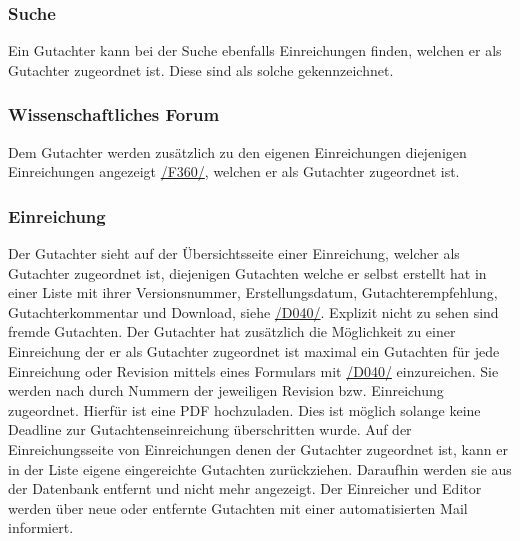\subsubsection{Suche}
\begin{description}
     Ein Gutachter kann bei der Suche ebenfalls Einreichungen finden, welchen er als Gutachter
    zugeordnet ist. Diese sind als solche gekennzeichnet.
\end{description}

\subsubsection{Wissenschaftliches Forum}
\begin{description}
     Dem Gutachter werden zusätzlich zu den eigenen Einreichungen diejenigen Einreichungen angezeigt
    \hyperref[funkt:360]{/F360/}, welchen er als Gutachter zugeordnet ist.
\end{description}

\subsubsection{Einreichung}\label{gut:ein}
\begin{description}
     Der Gutachter sieht auf der Übersichtsseite einer Einreichung, welcher als Gutachter
    zugeordnet ist, diejenigen Gutachten welche er selbst erstellt hat in einer
    Liste mit ihrer Versionsnummer, Erstellungsdatum, Gutachterempfehlung, Gutachterkommentar und Download,
    siehe \hyperref[d040]{/D040/}. Explizit nicht zu sehen sind fremde Gutachten.
     Der Gutachter hat zusätzlich die Möglichkeit zu einer Einreichung der er als Gutachter zugeordnet ist
    maximal ein Gutachten für jede Einreichung oder Revision mittels eines Formulars mit \hyperref[d040]{/D040/} einzureichen.
    Sie werden nach durch Nummern der jeweiligen Revision bzw. Einreichung zugeordnet.
    Hierfür ist eine PDF hochzuladen. Dies ist möglich solange keine Deadline zur Gutachtenseinreichung überschritten wurde.
     Auf der Einreichungsseite von Einreichungen denen der Gutachter zugeordnet ist,
    kann er in der Liste eigene eingereichte Gutachten zurückziehen.
    Daraufhin werden sie aus der Datenbank entfernt und nicht mehr angezeigt.
     Der Einreicher und Editor werden über neue oder entfernte Gutachten mit einer automatisierten
    Mail informiert.
\end{description}


